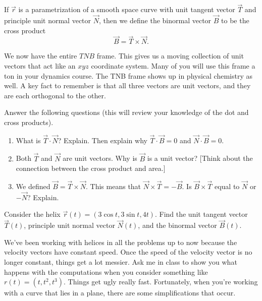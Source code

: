 \begin{definition}
 If $\vec r$ is a parametrization of a smooth space curve with unit tangent vector $\vec T$ and principle unit normal vector $\vec N$, then we define the binormal vector $\vec B$ to be the cross product
$$\vec B = \vec T\times \vec N.$$
\end{definition}

We now have the entire $TNB$ frame.  This gives us a moving collection of unit vectors that act like an $xyz$ coordinate system.  Many of you will use this frame a ton in your dynamics course. The TNB frame shows up in physical chemistry as well. A key fact to remember is that all three vectors are unit vectors, and they are each orthogonal to the other.

\begin{problem}
Answer the following questions (this will review your knowledge of the dot and cross products).
\begin{enumerate}
 \item What is $\vec T\cdot \vec N$? Explain. Then explain why $\vec T\cdot \vec B=0$ and $\vec N\cdot \vec B=0$.
 \item Both $\vec T$ and $\vec N$ are unit vectors. Why is $\vec B$ is a unit vector? [Think about the connection between the cross product and area.] 
 \item We defined $\vec B=\vec T\times \vec N$. This means that $\vec N\times \vec T=-\vec B$.  Is $\vec B\times \vec T$ equal to $\vec N$ or $-\vec N$? Explain.
\end{enumerate}
\end{problem}

\begin{problem} \label{helix example of T N and B}
%
Consider the helix $\vec r(t) = (3\cos t,3\sin t, 4t)$.  Find the unit tangent vector $\vec T(t)$, principle unit normal vector $\vec N(t)$, and the binormal vector $\vec B(t)$. 
\end{problem}

We've been working with helices in all the problems up to now because the velocity vectors have constant speed.  Once the speed of the velocity vector is no longer constant, things get a lot messier. Ask me in class to show you what happens with the computations when you consider something like $r(t)=(t,t^2,t^3)$. Things get ugly really fast. Fortunately, when you're working with a curve that lies in a plane, there are some simplifications that occur.

